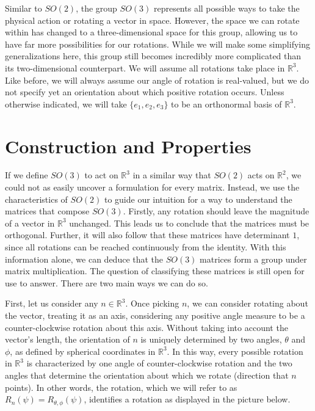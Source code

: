 \documentclass[10pt]{ucthesis}
\newcommand{\R}{\mathbb{R}}
\begin{document}
Similar to $SO(2)$, the group $SO(3)$ represents all possible ways to take the physical action or rotating a vector in space. However, the space we can rotate within has changed to a three-dimensional space for this group, allowing us to have far more possibilities for our rotations. While we will make some simplifying generalizations here, this group still becomes incredibly more complicated than its two-dimensional counterpart. We will assume all rotations take place in $\R^3$. Like before, we will always assume our angle of rotation is real-valued, but we do not specify yet an orientation about which positive rotation occurs. Unless otherwise indicated, we will take $\{e_1,e_2,e_3\}$ to be an orthonormal basis of $\R^3$.

\section{Construction and Properties}

If we define $SO(3)$ to act on $\R^3$ in a similar way that $SO(2)$ acts on $\R^2$, we could not as easily uncover a formulation for every matrix. Instead, we use the characteristics of $SO(2)$ to guide our intuition for a way to understand the matrices that compose $SO(3)$. Firstly, any rotation should leave the magnitude of a vector in $\R^3$ unchanged. This leads us to conclude that the matrices must be orthogonal. Further, it will also follow that these matrices have determinant $1$, since all rotations can be reached continuously from the identity. With this information alone, we can deduce that the $SO(3)$ matrices form a group under matrix multiplication. The question of classifying these matrices is still open for use to answer. There are two main ways we can do so.

First, let us consider any $n\in\R^3$. Once picking $n$, we can consider rotating about the vector, treating it as an axis, considering any positive angle measure to be a counter-clockwise rotation about this axis. Without taking into account the vector's length, the orientation of $n$ is uniquely determined by two angles, $\theta$ and $\phi$, as defined by spherical coordinates in $\R^3$. In this way, every possible rotation in $\R^3$ is characterized by one angle of counter-clockwise rotation and the two angles that determine the orientation about which we rotate (direction that $n$ points). In other words, the rotation, which we will refer to as $R_n(\psi) = R_{\theta,\phi}(\psi)$, identifies a rotation as displayed in the picture below.
\end{document}
